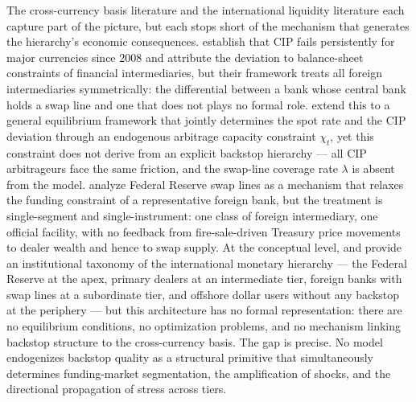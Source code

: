 The cross-currency basis literature and the international liquidity literature each capture part of
the picture, but each stops short of the mechanism that generates the hierarchy's economic
consequences. \citet{DuTepperVerdelhan2018} establish that CIP fails persistently for major
currencies since 2008 and attribute the deviation to balance-sheet constraints of financial
intermediaries, but their framework treats all foreign intermediaries symmetrically: the
differential between a bank whose central bank holds a swap line and one that does not plays
no formal role. \citet{BacchettaDavisVanWincoop2025} extend this to a general equilibrium
framework that jointly determines the spot rate and the CIP deviation through an endogenous
arbitrage capacity constraint $\chi_t$, yet this constraint does not derive from an explicit
backstop hierarchy — all CIP arbitrageurs face the same friction, and the swap-line coverage rate
$\lambda$ is absent from the model. \citet{CesaBianchiEgurenMartinFerrero2025} analyze Federal
Reserve swap lines as a mechanism that relaxes the funding constraint of a representative foreign
bank, but the treatment is single-segment and single-instrument: one class of foreign intermediary,
one official facility, with no feedback from fire-sale-driven Treasury price movements to dealer
wealth and hence to swap supply. At the conceptual level, \citet{MurauPapePforr2023} and
\citet{Mehrling2021} provide an institutional taxonomy of the international monetary hierarchy —
the Federal Reserve at the apex, primary dealers at an intermediate tier, foreign banks with swap
lines at a subordinate tier, and offshore dollar users without any backstop at the periphery — but
this architecture has no formal representation: there are no equilibrium conditions, no
optimization problems, and no mechanism linking backstop structure to the cross-currency basis.
The gap is precise. No model endogenizes backstop quality as a structural primitive that
simultaneously determines funding-market segmentation, the amplification of shocks, and the
directional propagation of stress across tiers.

